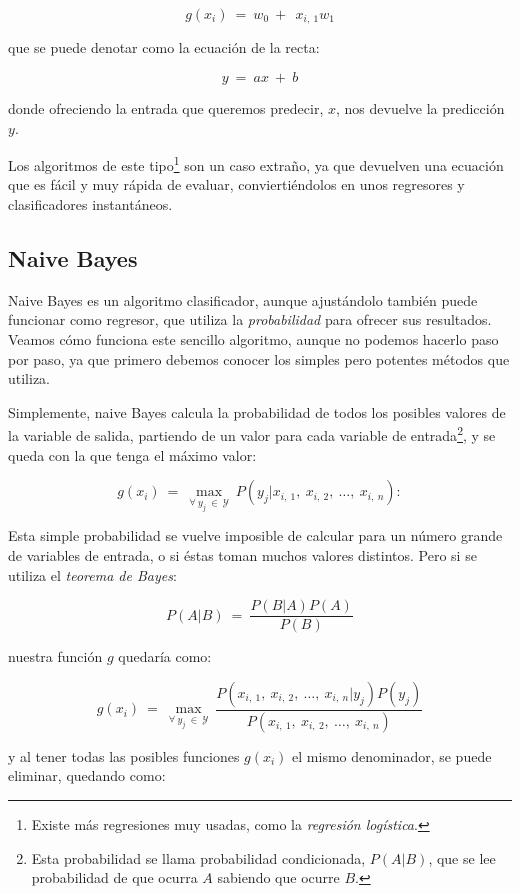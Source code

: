 $$
g(x_{i})\:=\:w_{0}\:+\:\:x_{i,\:1}w_{1}
$$

\noindent
que se puede denotar como la ecuación de la recta:

$$
y\:=\:ax\:+\:b
$$

\noindent
donde ofreciendo la entrada que queremos predecir, $x$, nos devuelve la predicción $y$.

Los algoritmos de este tipo\footnote{Existe más regresiones muy usadas, como la \emph{regresión logística}.} son un caso extraño, ya que devuelven una ecuación que es fácil y muy rápida de evaluar, conviertiéndolos en unos regresores y clasificadores instantáneos.

\subsection{Naive Bayes} \label{subsec:2.5.4}

Naive Bayes es un algoritmo clasificador, aunque ajustándolo también puede funcionar como regresor, que utiliza la \emph{probabilidad} para ofrecer sus resultados. Veamos cómo funciona este sencillo algoritmo, aunque no podemos hacerlo paso por paso, ya que primero debemos conocer los simples pero potentes métodos que utiliza.

Simplemente, naive Bayes calcula la probabilidad de todos los posibles valores de la variable de salida, partiendo de un valor para cada variable de entrada\footnote{Esta probabilidad se llama probabilidad condicionada, $P(A|B)$, que se lee probabilidad de que ocurra $A$ sabiendo que ocurre $B$.}, y se queda con la que tenga el máximo valor:

$$
g(x_{i})\:=\:\max_{\forall\:y_{j}\:\in\:\mathcal{Y}}\:P(y_{j}|x_{i,\:1},\:x_{i,\:2},\:\dots,\:x_{i,\:n}):
$$

Esta simple probabilidad se vuelve imposible de calcular para un número grande de variables de entrada, o si éstas toman muchos valores distintos. Pero si se utiliza el \emph{teorema de Bayes}:

$$
P(A|B)\:=\:\frac{P(B|A)P(A)}{P(B)}
$$

\noindent
nuestra función $g$ quedaría como:

$$
g(x_{i})\:=\:\max_{\forall\:y_{j}\:\in\:\mathcal{Y}}\:\frac{P(x_{i,\:1},\:x_{i,\:2},\:\dots,\:x_{i,\:n}|y_{j})P(y_{j})}{P(x_{i,\:1},\:x_{i,\:2},\:\dots,\:x_{i,\:n})}
$$

\noindent
y al tener todas las posibles funciones $g(x_{i})$ el mismo denominador, se puede eliminar, quedando como:

